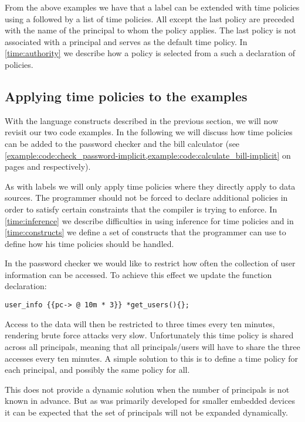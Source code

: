 From the above examples we have that a label can be extended with time policies using a  followed by a list of time policies.
All except the last policy are preceded with the name of the principal to whom the policy applies.
The last policy is not associated with a principal and serves as the default time policy.
In \cref{time:authority} we describe how a policy is selected from a such a declaration of policies.

\subsection{Applying time policies to the examples}
With the language constructs described in the previous section, we will now revisit our two code examples.
In the following we will discuss how time policies can be added to the password checker and the bill calculator (see \cref{example:code:check_password-implicit,example:code:calculate_bill-implicit} on pages \pageref{example:code:check_password-implicit} and \pageref{example:code:calculate_bill-implicit} respectively).

As with labels we will only apply time policies where they directly apply to data sources.
The programmer should not be forced to declare additional policies in order to satisfy certain constraints that the compiler is trying to enforce.
In \cref{time:inference} we describe difficulties in using inference for time policies and in \cref{time:constructs} we define a set of constructs that the programmer can use to define how his time policies should be handled.

In the password checker we would like to restrict how often the collection of user information  can be accessed.
To achieve this effect we update the function declaration:

\begin{lstlisting}[style=dlmc]
  user_info {{pc-> @ 10m * 3}} *get_users(){};
\end{lstlisting}

Access to the data will then be restricted to three times every ten minutes, rendering brute force attacks very slow.
Unfortunately this time policy is shared across all principals, meaning that all principals/users will have to share the three accesses every ten minutes.
A simple solution to this is to define a time policy for each principal, and possibly the same policy for all.

This does not provide a dynamic solution when the number of principals is not known in advance.
But as \thelang{} was primarily developed for smaller embedded devices it can be expected that the set of principals will not be expanded dynamically.


